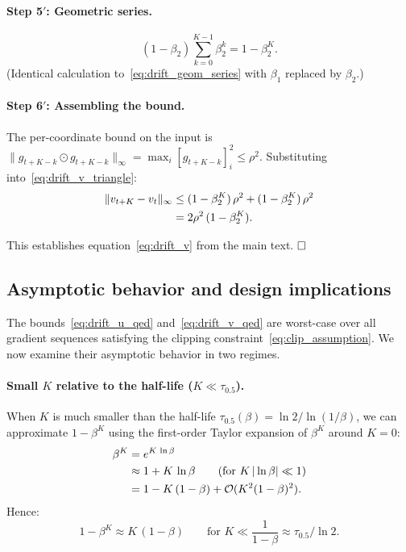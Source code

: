 \documentclass{article}
\begin{document}
\paragraph{Step 5$'$: Geometric series.}
\begin{equation}
(1-\beta_2)\sum_{k=0}^{K-1}\beta_2^k = 1 - \beta_2^K.
\label{eq:drift_v_geom}
\end{equation}
(Identical calculation to~\eqref{eq:drift_geom_series} with $\beta_1$
replaced by $\beta_2$.)

\paragraph{Step 6$'$: Assembling the bound.}

The per-coordinate bound on the input is
$\|g_{t+K-k} \odot g_{t+K-k}\|_\infty = \max_i [g_{t+K-k}]_i^2 \leq \rho^2$.
Substituting into~\eqref{eq:drift_v_triangle}:
\begin{align}
\|v_{t+K} - v_t\|_\infty
&\leq (1-\beta_2^K)\,\rho^2 + (1-\beta_2^K)\,\rho^2
\notag \\
&= 2\rho^2\,(1-\beta_2^K).
\label{eq:drift_v_qed}
\end{align}

This establishes equation~\eqref{eq:drift_v} from the main text. $\hfill\square$

\subsection{Asymptotic behavior and design implications}
\label{sec:drift_asymptotics}

The bounds~\eqref{eq:drift_u_qed} and~\eqref{eq:drift_v_qed} are
worst-case over all gradient sequences satisfying the clipping
constraint~\eqref{eq:clip_assumption}. We now examine their asymptotic
behavior in two regimes.

\paragraph{Small $K$ relative to the half-life ($K \ll \tau_{0.5}$).}

When $K$ is much smaller than the half-life
$\tau_{0.5}(\beta) = \ln 2 / \ln(1/\beta)$, we can approximate
$1 - \beta^K$ using the first-order Taylor expansion of $\beta^K$
around $K = 0$:
\begin{align}
\beta^K
&= e^{K\,\ln\beta} \notag \\
&\approx 1 + K\,\ln\beta
\qquad\text{(for $K\,|\ln\beta| \ll 1$)} \notag \\
&= 1 - K\,(1-\beta) + \mathcal{O}(K^2(1-\beta)^2).
\label{eq:drift_taylor}
\end{align}
Hence:
\begin{equation}
1 - \beta^K \approx K\,(1-\beta)
\qquad\text{for } K \ll \frac{1}{1-\beta} \approx \tau_{0.5}/\ln 2.
\label{eq:drift_linear}
\end{equation}
\end{document}
